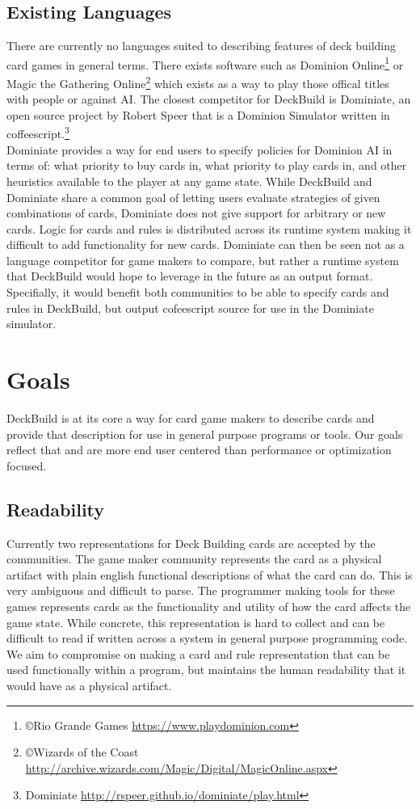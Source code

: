 \subsection{Existing Languages}
There are currently no languages suited to describing features of deck building card games in general
terms. There exists software such as Dominion Online\footnote{\copyright Rio Grande Games \url{https://www.playdominion.com}} or Magic the Gathering Online\footnote{\copyright Wizards of the Coast \url{http://archive.wizards.com/Magic/Digital/MagicOnline.aspx}} which exists as
a way to play those offical titles with people or against AI.
The closest competitor for DeckBuild is Dominiate, an
open source project by Robert Speer that is a Dominion Simulator written in coffeescript.\footnote{Dominiate \url{http://rspeer.github.io/dominiate/play.html}}
\\
Dominiate provides a way for end users to specify policies for Dominion AI in terms of:
what priority to buy cards in, what priority to play cards in, and other heuristics available
to the player at any game state. While DeckBuild and Dominiate share a common goal of letting users evaluate
strategies of given combinations of cards, Dominiate does not give support for arbitrary or new cards.
Logic for cards and rules is distributed across its runtime system making it
difficult to add functionality for new cards. Dominiate can then be seen not as a language competitor
 for game makers to compare, but rather a runtime system that DeckBuild would hope to leverage in the
 future as an output format. Specifially, it would benefit both communities to be able to specify
 cards and rules in DeckBuild, but output cofeescript source for use in the Dominiate simulator.
\section{Goals} \label{sec:goals}
DeckBuild is at its core a way for card game makers to describe cards and provide that description
for use in general purpose programs or tools. Our goals reflect that and are more end user centered than
performance or optimization focused.
\subsection{Readability}
Currently two representations for Deck Building cards are accepted by the communities. The game maker
community represents the card as a physical artifact with plain english functional descriptions
of what the card can do. This is very ambiguous and difficult to parse. The
programmer making tools for these games represents cards as the functionality and utility of how the
card affects the game state. While concrete, this representation is hard to collect and can be difficult to read
if written across a system in general purpose programming code. We aim to compromise
on making a card and rule representation that can be used functionally within a program, but maintains
the human readability that it would have as a physical artifact.

